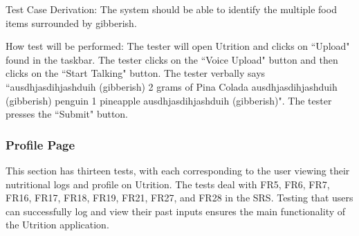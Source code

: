 \documentclass[12pt, titlepage]{article}
\begin{document}
\begin{enumerate}
	Test Case Derivation: The system should be able to identify the multiple food items surrounded by gibberish.
	
	How test will be performed: The tester will open Utrition and clicks on ``Upload" found in the taskbar. The tester clicks on the ``Voice Upload" button and then clicks on the ``Start Talking" button. The tester verbally says ``ausdhjasdihjashduih (gibberish) 2 grams of Pina Colada ausdhjasdihjashduih (gibberish) penguin 1 pineapple ausdhjasdihjashduih (gibberish)". The tester presses the ``Submit" button.
	
\end{enumerate}
	
	\subsubsection{Profile Page}
	This section has thirteen tests, with each corresponding to the user viewing their nutritional logs and profile on Utrition. The tests deal with FR5, FR6, FR7, FR16, FR17, FR18, FR19, FR21, FR27, and FR28 in the SRS. Testing that users can successfully log and view their past inputs ensures the main functionality of the Utrition application.
	
\end{document}
